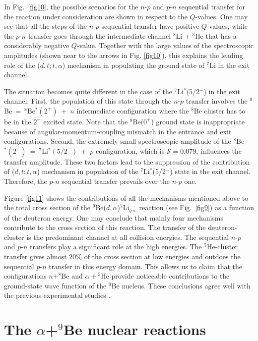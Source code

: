 \documentclass[
12pt, %
oneside, %
english, %
onehalfspacing, %
headsepline, %
]{MastersDoctoralThesis} %
\begin{document}
In Fig.~\ref{fig10}, the possible scenarios for the $n$-$p$ and $p$-$n$ sequential transfer for the reaction under consideration are shown in respect to the $Q$-values. One may see that all the steps of the $n$-$p$ sequential transfer have positive $Q$-values, while the $p$-$n$ transfer goes through the intermediate channel ${}^8$Li + ${}^3$He that has a considerably negative $Q$-value. Together with the large values of the spectroscopic amplitudes (shown near to the arrows in Fig. \ref{fig10}), this explains the leading role of the ($d,t;t,\alpha$) mechanism in populating the ground state of ${}^7$Li in the exit channel.


The situation becomes quite different in the case of the ${}^7$Li$^*$(5/2$^-$) in the exit channel. First, the population of this state through the $n$-$p$ transfer involves the ${}^9$Be~=~${}^8$Be$^*(2^+)$~+~$n$ intermediate configuration where the ${}^8$Be cluster has to be in the $2^+$ excited state. Note that the ${}^8$Be($0^+$) ground state is inappropriate because of angular-momentum-coupling mismatch in the entrance and exit configurations. Second, the extremely small spectroscopic amplitude of the ${}^8$Be$^*(2^+)$~=~${}^7$Li$^*(5/2^-)$~+~$p$ configuration, which is $\mathcal{S} = 0.079$, influences the transfer amplitude. These two factors lead to the suppression of the contribution of ($d,t;t,\alpha$) mechanism in population of the ${}^7$Li$^*$(5/2$^-$) state in the exit channel. Therefore, the $p$-$n$ sequential transfer prevails over the $n$-$p$ one. 

Figure \ref{fig11} shows the contributions of all the mechanisms mentioned above to the total cross section of the ${}^9$Be($d,\alpha$)${}^7$Li$_{g.s.}$ reaction (see Fig.~\ref{fig9}) as a function of the deuteron energy. One may conclude that mainly four mechanisms contribute to the cross section of this reaction. The transfer of the deuteron-cluster is the predominant channel at all collision energies. The sequential $n$-$p$ and $p$-$n$ transfers play a significant role at the high energies. The ${}^5$He-cluster transfer gives almost 20\% of the cross section at low energies and outdoes the sequential $p$-$n$ transfer in this energy domain. This allows us to claim that the configurations $n+^8$Be and $\alpha+{}^5$He provide noticeable contributions to the ground-state wave function of the ${}^9$Be nucleus. These conclusions agree well with the previous experimental studies \cite{brown2007, papka2007}.

\section{The $\alpha$+$^9$Be nuclear reactions}
\end{document}
